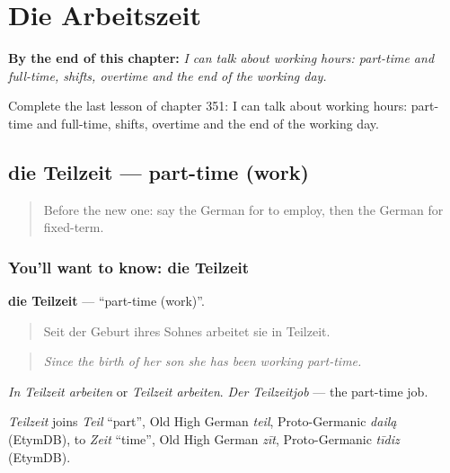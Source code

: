 
\chapter{Die Arbeitszeit}
\label{ch:ge-die-arbeitszeit}

\begin{chapteropening}
\textbf{By the end of this chapter:} \emph{I can talk about working hours: part-time and full-time, shifts, overtime and the end of the working day.}

Complete the last lesson of chapter 351: I can talk about working hours: part-time and full-time, shifts, overtime and the end of the working day.
\end{chapteropening}

\section[die Teilzeit]{die Teilzeit — part-time (work)}

\label{lesson:GE-C351-teilzeit}



\begin{quote}
Before the new one: say the German for to employ, then the German for fixed-term.
\end{quote}

\subsection*{You'll want to know: die Teilzeit}
\textbf{die Teilzeit} — \textquotedblleft{}part-time (work)\textquotedblright{}.

\begin{quote}
Seit der Geburt ihres Sohnes arbeitet sie in Teilzeit.
\end{quote}

\begin{quote}
\emph{Since the birth of her son she has been working part-time.}
\end{quote}

\emph{In Teilzeit arbeiten} or \emph{Teilzeit arbeiten}. \emph{Der Teilzeitjob} — the part-time job.

\begin{cousinweb}
\emph{Teilzeit} joins \emph{Teil} \textquotedblleft{}part\textquotedblright{}, Old High German \emph{teil}, Proto-Germanic \emph{dailą} (EtymDB), to \emph{Zeit} \textquotedblleft{}time\textquotedblright{}, Old High German \emph{zīt}, Proto-Germanic \emph{tīdiz} (EtymDB).
\end{cousinweb}

